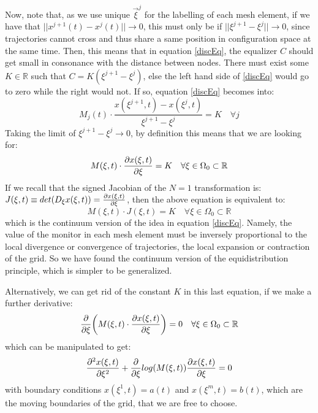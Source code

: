 \documentclass[11pt, a4paper]{article} %
\newcommand{\R}{\mathbb{R}} %
\begin{document}
Now, note that, as we use unique $\vec{\xi}^j$ for the labelling of each mesh element, if we have that $||x^{j+1}(t)-x^j(t)||\rightarrow 0$, this must only be if $||\xi^{j+1}-\xi^j||\rightarrow 0$, since trajectories cannot cross and thus share a same position in configuration space at the same time. Then, this means that in equation \eqref{discEq}, the equalizer $C$ should get small in consonance with the distance between nodes. There must exist some $K\in\R$ such that $C=K(\xi^{j+1}-\xi^j)$, else the left hand side of \eqref{discEq} would go to zero while the right would not. If so, equation \eqref{discEq} becomes into:
\begin{equation}
M_j(t)\cdot \frac{x(\xi^{j+1},t)-x(\xi^{j},t)}{\xi^{j+1}-\xi^j}=K \quad \forall j
\end{equation}
Taking the limit of $\xi^{j+1}-\xi^j\rightarrow 0$, by definition this means that we are looking for:
\begin{equation}\label{contEq}
M(\xi,t)\cdot \pdv{x(\xi,t)}{\xi}=K \quad \forall \xi\in \Omega_0\subset \R
\end{equation}
If we recall that the signed Jacobian of the $N=1$ transformation is: $J(\xi,t)\equiv det(D_{\xi}x(\xi,t))=\pdv{x(\xi,t)}{\xi}$, then the above equation is equivalent to:
\begin{equation}
M(\xi,t)\cdot J(\xi,t)=K \quad \forall \xi\in \Omega_0\subset \R
\end{equation}
which is the continuum version of the idea in equation \eqref{discEq}. Namely, the value of the monitor in each mesh element must be inversely proportional to the local divergence or convergence of trajectories, the local expansion or contraction of the grid. So we have found the continuum version of the equidistribution principle, which is simpler to be generalized.

Alternatively, we can get rid of the constant $K$ in this last equation, if we make a further derivative:
\begin{equation}\label{EL1D}
\pdv{}{\xi}\qty(M(\xi,t)\cdot \pdv{x(\xi,t)}{\xi})=0 \quad \forall \xi\in \Omega_0\subset \R
\end{equation}
which can be manipulated to get:
\begin{equation}
\pdv[2]{x(\xi,t)}{\xi}+\pdv{}{\xi}log(M(\xi,t))\pdv{x(\xi,t)}{\xi}=0
\end{equation}
with boundary conditions $x(\xi^1,t)=a(t)$ and $x(\xi^m,t)=b(t)$, which are the moving boundaries of the grid, that we are free to choose.
\end{document}
